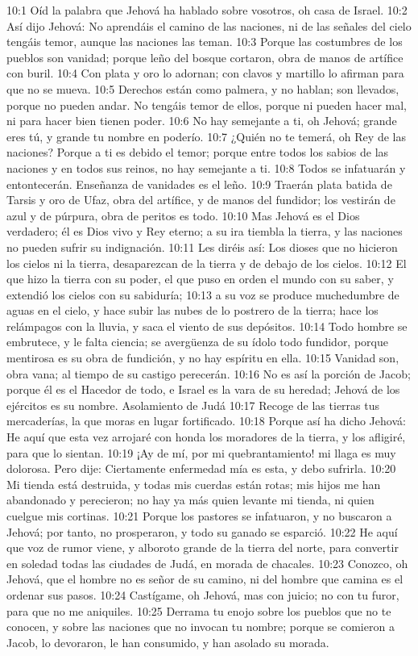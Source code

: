 10:1 Oíd la palabra que Jehová ha hablado sobre vosotros, oh casa de Israel. 
10:2 Así dijo Jehová: No aprendáis el camino de las naciones, ni de las señales del cielo tengáis temor, aunque las naciones las teman. 
10:3 Porque las costumbres de los pueblos son vanidad; porque leño del bosque cortaron, obra de manos de artífice con buril. 
10:4 Con plata y oro lo adornan; con clavos y martillo lo afirman para que no se mueva. 
10:5 Derechos están como palmera, y no hablan; son llevados, porque no pueden andar. No tengáis temor de ellos, porque ni pueden hacer mal, ni para hacer bien tienen poder. 
10:6 No hay semejante a ti, oh Jehová; grande eres tú, y grande tu nombre en poderío. 
10:7 ¿Quién no te temerá, oh Rey de las naciones? Porque a ti es debido el temor; porque entre todos los sabios de las naciones y en todos sus reinos, no hay semejante a ti. 
10:8 Todos se infatuarán y entontecerán. Enseñanza de vanidades es el leño. 
10:9 Traerán plata batida de Tarsis y oro de Ufaz, obra del artífice, y de manos del fundidor; los vestirán de azul y de púrpura, obra de peritos es todo. 
10:10 Mas Jehová es el Dios verdadero; él es Dios vivo y Rey eterno; a su ira tiembla la tierra, y las naciones no pueden sufrir su indignación. 
10:11 Les diréis así: Los dioses que no hicieron los cielos ni la tierra, desaparezcan de la tierra y de debajo de los cielos. 
10:12 El que hizo la tierra con su poder, el que puso en orden el mundo con su saber, y extendió los cielos con su sabiduría; 
10:13 a su voz se produce muchedumbre de aguas en el cielo, y hace subir las nubes de lo postrero de la tierra; hace los relámpagos con la lluvia, y saca el viento de sus depósitos. 
10:14 Todo hombre se embrutece, y le falta ciencia; se avergüenza de su ídolo todo fundidor, porque mentirosa es su obra de fundición, y no hay espíritu en ella. 
10:15 Vanidad son, obra vana; al tiempo de su castigo perecerán. 
10:16 No es así la porción de Jacob; porque él es el Hacedor de todo, e Israel es la vara de su heredad; Jehová de los ejércitos es su nombre. 
Asolamiento de Judá 
10:17 Recoge de las tierras tus mercaderías, la que moras en lugar fortificado. 
10:18 Porque así ha dicho Jehová: He aquí que esta vez arrojaré con honda los moradores de la tierra, y los afligiré, para que lo sientan. 
10:19 ¡Ay de mí, por mi quebrantamiento! mi llaga es muy dolorosa. Pero dije: Ciertamente enfermedad mía es esta, y debo sufrirla. 
10:20 Mi tienda está destruida, y todas mis cuerdas están rotas; mis hijos me han abandonado y perecieron; no hay ya más quien levante mi tienda, ni quien cuelgue mis cortinas. 
10:21 Porque los pastores se infatuaron, y no buscaron a Jehová; por tanto, no prosperaron, y todo su ganado se esparció. 
10:22 He aquí que voz de rumor viene, y alboroto grande de la tierra del norte, para convertir en soledad todas las ciudades de Judá, en morada de chacales. 
10:23 Conozco, oh Jehová, que el hombre no es señor de su camino, ni del hombre que camina es el ordenar sus pasos. 
10:24 Castígame, oh Jehová, mas con juicio; no con tu furor, para que no me aniquiles. 
10:25 Derrama tu enojo sobre los pueblos que no te conocen, y sobre las naciones que no invocan tu nombre; porque se comieron a Jacob, lo devoraron, le han consumido, y han asolado su morada. 
